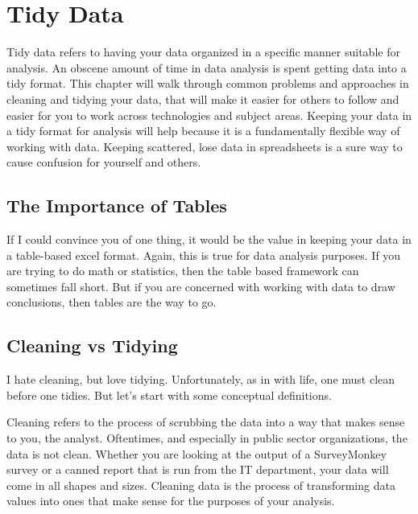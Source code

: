 \documentclass[]{book}
\begin{document}
\hypertarget{tidy-data}{%
\chapter{Tidy Data}\label{tidy-data}}

Tidy data refers to having your data organized in a specific manner suitable for analysis. An obscene amount of time in data analysis is spent getting data into a tidy format. This chapter will walk through common problems and approaches in cleaning and tidying your data, that will make it easier for others to follow and easier for you to work across technologies and subject areas. Keeping your data in a tidy format for analysis will help because it is a fundamentally flexible way of working with data. Keeping scattered, lose data in spreadsheets is a sure way to cause confusion for yourself and others.

\hypertarget{the-importance-of-tables}{%
\section{The Importance of Tables}\label{the-importance-of-tables}}

If I could convince you of one thing, it would be the value in keeping your data in a table-based excel format. Again, this is true for data analysis purposes. If you are trying to do math or statistics, then the table based framework can sometimes fall short. But if you are concerned with working with data to draw conclusions, then tables are the way to go.

\hypertarget{cleaning-vs-tidying}{%
\section{Cleaning vs Tidying}\label{cleaning-vs-tidying}}

I hate cleaning, but love tidying. Unfortunately, as in with life, one must clean before one tidies. But let's start with some conceptual definitions.

Cleaning refers to the process of scrubbing the data into a way that makes sense to you, the analyst. Oftentimes, and especially in public sector organizations, the data is not clean. Whether you are looking at the output of a SurveyMonkey survey or a canned report that is run from the IT department, your data will come in all shapes and sizes. Cleaning data is the process of transforming data values into ones that make sense for the purposes of your analysis.
\end{document}
